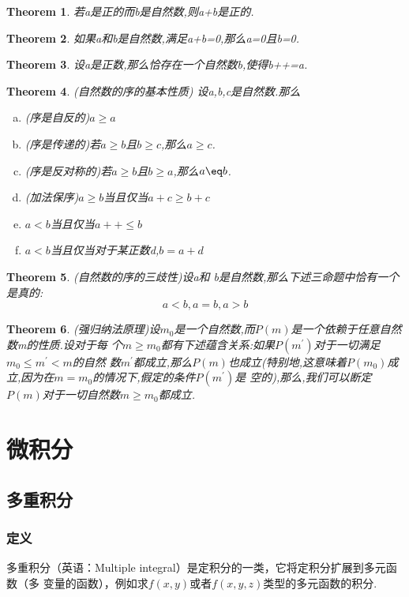 \documentclass[UTF-8]{ctexart}
\newtheorem{theorem}{Theorem}[section]
\begin{document}
\begin{theorem}
若a是正的而b是自然数,则a+b是正的.
\end{theorem}

\begin{theorem}
如果a和b是自然数,满足a+b=0,那么a=0且b=0.
\end{theorem}

\begin{theorem}
设a是正数,那么恰存在一个自然数b,使得b++=a.
\end{theorem}

\begin{theorem}
  (自然数的序的基本性质) 设a,b,c是自然数.那么
\begin{enumerate}[(a)]
\item (序是自反的)$a\geq a$
\item (序是传递的)若$a \geq b$且$b \geq c$,那么$a \geq c$.
\item (序是反对称的)若$a \geq b$且$b \geq a$,那么$a \eq b$.
\item (加法保序)$a \geq b$当且仅当$a+c \geq b+c$
\item $a < b $当且仅当$a++ \leq b$
\item $a < b $当且仅当对于某正数d,$b=a+d$
\end{enumerate}
\end{theorem}

\begin{theorem}
  (自然数的序的三歧性)设a和
  b是自然数,那么下述三命题中恰有一个是真的:
  $$a<b,a=b,a>b$$
\end{theorem}

\begin{theorem}
(强归纳法原理)设$m_0$是一个自然数,而$P(m)$是一个依赖于任意自然数m的性质.设对于每
个$m \geq m_0$都有下述蕴含关系:如果$P(m^')$对于一切满足$m_0 \leq m^{'}  < m$的自然
数$m^'$都成立,那么$P(m
)$也成立(特别地,这意味着$P(m_0)$成立,因为在$m=m_0$的情况下,假定的条件$P(m^')$是
空的),那么,我们可以断定$P(m)$对于一切自然数$m \geq m_0$都成立.
\end{theorem}

\newpage
\section{微积分}
\subsection{多重积分}
\subsubsection{定义}
多重积分（英语：Multiple integral）是定积分的一类，它将定积分扩展到多元函数（多
变量的函数），例如求$f(x,y)$或者$f(x,y,z)$类型的多元函数的积分.
\end{document}
